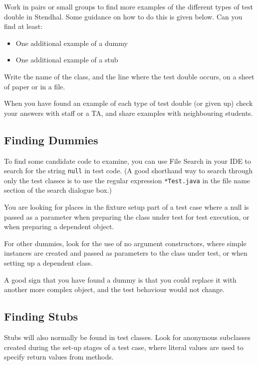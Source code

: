 \documentclass[
]{book}
\providecommand{\tightlist}{%
  \setlength{\itemsep}{0pt}\setlength{\parskip}{0pt}}
\begin{document}
Work in pairs or small groups to find more examples of the different types of test double in Stendhal. Some guidance on how to do this is given below. Can you find at least:

\begin{itemize}
\tightlist
\item
  One additional example of a dummy
\item
  One additional example of a stub
\end{itemize}

Write the name of the class, and the line where the test double occurs, on a sheet of paper or in a file.

When you have found an example of each type of test double (or given up) check your answers with staff or a TA, and share examples with neighbouring students.

\hypertarget{findum}{%
\subsection{Finding Dummies}\label{findum}}

To find some candidate code to examine, you can use File Search in your IDE to search for the string \texttt{null} in test code. (A good shorthand way to search through only the test classes is to use the regular expression \texttt{*Test.java} in the file name section of the search dialogue box.)

You are looking for places in the fixture setup part of a test case where a null is passed as a parameter when preparing the class under test for test execution, or when preparing a dependent object.

For other dummies, look for the use of no argument constructors, where simple instances are created and passed as parameters to the class under test, or when setting up a dependent class.

A good sign that you have found a dummy is that you could replace it with another more complex object, and the test behaviour would not change.

\hypertarget{findstubs}{%
\subsection{Finding Stubs}\label{findstubs}}

Stubs will also normally be found in test classes. Look for anonymous subclasses created during the set-up stages of a test case, where literal values are used to specify return values from methods.
\end{document}
